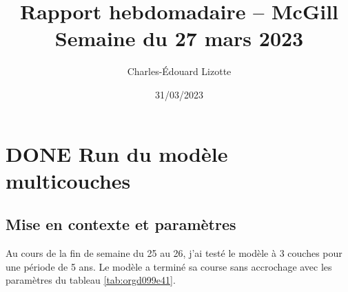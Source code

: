 \documentclass{article}
\author{Charles-Édouard Lizotte}
\date{31/03/2023}
\title{Rapport hebdomadaire -- McGill\\\medskip
\large Semaine du 27 mars 2023}
\numberwithin{equation}{section}
\begin{document}
\maketitle
\tableofcontents



\section{{\bfseries\sffamily DONE} Run du modèle multicouches}
\label{sec:orgef051e7}
\subsection{Mise en contexte et paramètres}
\label{sec:org414c76c}
Au cours de la fin de semaine du 25 au 26, j'ai testé le modèle à 3 couches pour une période de 5 ans.
Le modèle a terminé sa course sans accrochage avec les paramètres du tableau \ref{tab:orgd099e41}.
\end{document}
